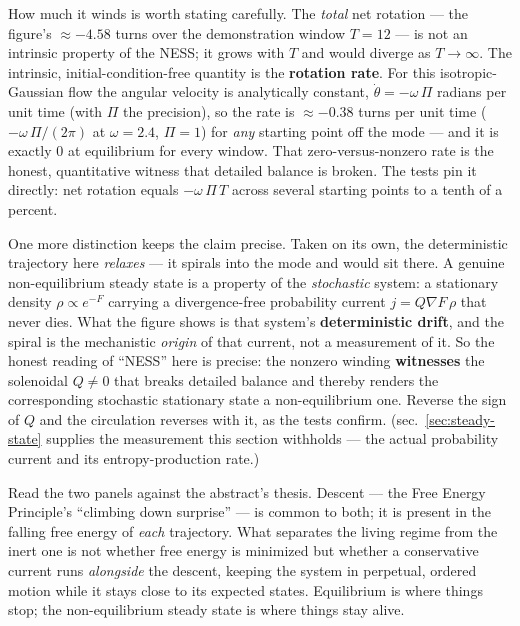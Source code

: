 \documentclass[
  english,
]{article}
\begin{document}
How much it winds is worth stating carefully. The \emph{total} net
rotation --- the figure's \(\approx -4.58\) turns over the demonstration
window \(T=12\) --- is not an intrinsic property of the NESS; it grows
with \(T\) and would diverge as \(T \to \infty\). The intrinsic,
initial-condition-free quantity is the \textbf{rotation rate}. For this
isotropic-Gaussian flow the angular velocity is analytically constant,
\(\dot\theta = -\omega\,\Pi\) radians per unit time (with \(\Pi\) the
precision), so the rate is \(\approx -0.38\) turns per unit time
(\(-\omega\,\Pi/(2\pi)\) at \(\omega=2.4\), \(\Pi=1\)) for \emph{any}
starting point off the mode --- and it is exactly \(0\) at equilibrium
for every window. That zero-versus-nonzero rate is the honest,
quantitative witness that detailed balance is broken. The tests pin it
directly: net rotation equals \(-\omega\,\Pi\,T\) across several
starting points to a tenth of a percent.

One more distinction keeps the claim precise. Taken on its own, the
deterministic trajectory here \emph{relaxes} --- it spirals into the
mode and would sit there. A genuine non-equilibrium steady state is a
property of the \emph{stochastic} system: a stationary density
\(\rho \propto e^{-F}\) carrying a divergence-free probability current
\(j = Q\nabla F\,\rho\) that never dies. What the figure shows is that
system's \textbf{deterministic drift}, and the spiral is the mechanistic
\emph{origin} of that current, not a measurement of it. So the honest
reading of ``NESS'' here is precise: the nonzero winding
\textbf{witnesses} the solenoidal \(Q \neq 0\) that breaks detailed
balance and thereby renders the corresponding stochastic stationary
state a non-equilibrium one. Reverse the sign of \(Q\) and the
circulation reverses with it, as the tests confirm.
(sec.~\ref{sec:steady-state} supplies the measurement this section
withholds --- the actual probability current and its entropy-production
rate.)

Read the two panels against the abstract's thesis. Descent --- the Free
Energy Principle's ``climbing down surprise'' --- is common to both; it
is present in the falling free energy of \emph{each} trajectory. What
separates the living regime from the inert one is not whether free
energy is minimized but whether a conservative current runs
\emph{alongside} the descent, keeping the system in perpetual, ordered
motion while it stays close to its expected states. Equilibrium is where
things stop; the non-equilibrium steady state is where things stay
alive.
\end{document}
